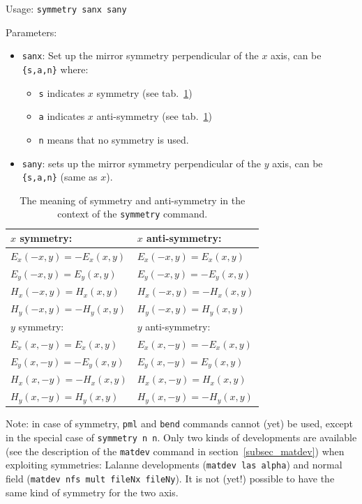 Usage: \lstinline!symmetry sanx sany!
     
Parameters: 
\begin{itemize}
\item \lstinline!sanx!: Set up the mirror symmetry perpendicular of the $x$ axis, can be  \lstinline!{s,a,n}! where:
\begin{itemize}
    \item \lstinline!s! indicates $x$ symmetry (see tab.~\ref{tab_symmetry})
    \item \lstinline!a! indicates $x$ anti-symmetry (see tab.~\ref{tab_symmetry})
    \item \lstinline!n! means that no symmetry is used.
\end{itemize}
\item \lstinline!sany!: sets up the mirror symmetry perpendicular of the $y$ axis, can be \lstinline!{s,a,n}! (same as $x$).
\end{itemize}

\begin{table}
\centering
\begin{tabular}{ll}
\hline
$x$ symmetry:           & $x$ anti-symmetry: \\
\hline
$E_x(-x,y)=-E_x(x,y)$   & $E_x(-x,y)=E_x(x,y)$ \\
$E_y(-x,y)=E_y(x,y)$    & $E_y(-x,y)=-E_y(x,y)$ \\
$H_x(-x,y)=H_x(x,y)$    & $H_x(-x,y)=-H_x(x,y)$ \\
$H_y(-x,y)=-H_y(x,y)$   & $H_y(-x,y)=H_y(x,y)$ \\
\hline
$y$ symmetry:           & $y$ anti-symmetry: \\
\hline
$E_x(x,-y)=E_x(x,y)$    & $E_x(x,-y)=-E_x(x,y)$ \\
$E_y(x,-y)=-E_y(x,y)$   & $E_y(x,-y)=E_y(x,y)$ \\
$H_x(x,-y)=-H_x(x,y)$   & $H_x(x,-y)=H_x(x,y)$ \\
$H_y(x,-y)=H_y(x,y)$    & $H_y(x,-y)=-H_y(x,y)$ \\
\hline
\end{tabular}
\caption{The meaning of symmetry and anti-symmetry in the context of the \lstinline!symmetry! command.}
\label{tab_symmetry}
\end{table}

Note: in case of symmetry, \lstinline!pml! and \lstinline!bend! commands cannot (yet) be used, except in the special case of \lstinline!symmetry n n!.
Only two kinds of developments are available (see the description of the \lstinline!matdev! command in section~\ref{subsec_matdev}) when exploiting symmetries: Lalanne developments (\lstinline!matdev las alpha!) and normal field (\lstinline!matdev nfs mult fileNx fileNy!). It is not (yet!) possible to have the same kind of symmetry for the two axis.

